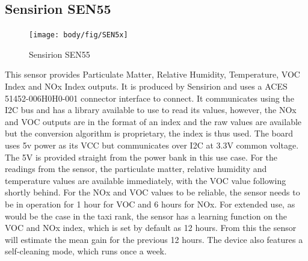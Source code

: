 \subsection{Sensirion SEN55}
\begin{figure}[!htb]
	\centering
	\texttt{[image: body/fig/SEN5x]}
	\caption{Sensirion SEN55}
	\label{fig:sen5x}
\end{figure}
\noindent
This sensor provides Particulate Matter, Relative Humidity, Temperature, VOC Index and NOx Index outputs.
It is produced by Sensirion and uses a ACES 51452-006H0H0-001 connector interface to connect. It communicates using the I2C bus and has a library available to use to read its values, however, the NOx and VOC outputs are in the format of an index and the raw values are available but the conversion algorithm is proprietary, the index is thus used. The board uses 5v power as its VCC but communicates over I2C at 3.3V common voltage. The 5V is provided straight from the power bank in this use case.
For the readings from the sensor, the particulate matter, relative humidity and temperature values are available immediately, with the VOC value following shortly behind. For the NOx and VOC values to be reliable, the sensor needs to be in operation for 1 hour for VOC and 6 hours for NOx. For extended use, as would be the case in the taxi rank, the sensor has a learning function on the VOC and NOx index, which is set by default as 12 hours. From this the sensor will estimate the mean gain for the previous 12 hours. The device also features a self-cleaning mode, which runs once a week.


